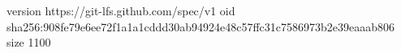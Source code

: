 version https://git-lfs.github.com/spec/v1
oid sha256:908fe79e6ee72f1a1a1cddd30ab94924e48c57ffc31c7586973b2e39eaaab806
size 1100
